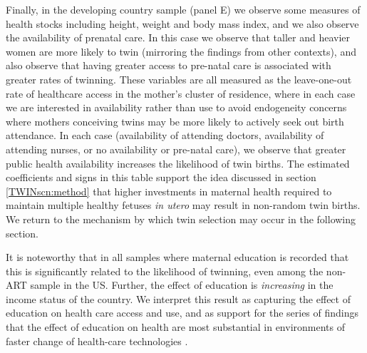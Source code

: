 \documentclass[subeqn]{article}
\begin{document}
\begin{spacing}{1.4}
Finally, in the developing country sample (panel E) we observe some measures of
health stocks including height, weight and body mass index, and we also observe
the availability of prenatal care.  In this case we observe that taller and
heavier women are more likely to twin (mirroring the findings from other
contexts), and also observe that having greater access to pre-natal care is
associated with greater rates of twinning.  These variables are all measured
as the leave-one-out rate of healthcare access in the mother's cluster of
residence, where in each case we are interested in availability rather than
use to avoid endogeneity concerns where mothers conceiving twins may be more
likely to actively seek out birth attendance.  In each case (availability
of attending doctors, availability of attending nurses, or no availability or
pre-natal care), we observe that greater public health availability increases
the likelihood of twin births.  The estimated coefficients and signs in this
table support the idea discussed in section \ref{TWINscn:method} that higher
investments in maternal health required to maintain multiple healthy fetuses
\emph{in utero} may result in non-random twin births. We return to the
mechanism by which twin selection may occur in the following section.

It is noteworthy that in all samples where maternal education is recorded that
this is significantly related to the likelihood of twinning, even among the
non-ART sample in the US.  Further, the effect of education is \emph{increasing}
in the income status of the country.  We interpret this result as capturing the
effect of education on health care access and use, and as support for the series
of findings that the effect of education on health are most substantial in
environments of faster change of health-care technologies \citep{LlerasMuney2005,
CutlerLlerasMuney2010}.


\end{spacing}
\end{document}
